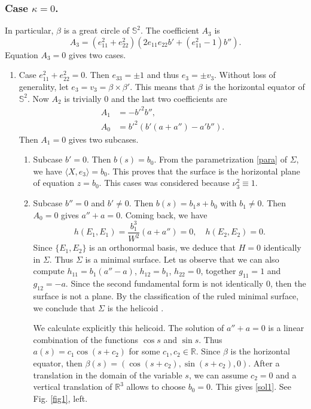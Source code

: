 \documentclass[12pt,a4paper,reqno]{amsart}
\def\r{\mathbb R}
\def\s{\mathbb S}
\begin{document}
\subsubsection{Case $\kappa=0$. } In particular, $\beta$ is a great circle of $\s^2$. The coefficient $A_3$ is 
$$A_3=(e_{11}^2+e_{22}^2)\left(2e_{11}e_{22}b'+(e_{11}^2-1)b''\right).$$
Equation $A_3=0$ gives two cases.
\begin{enumerate}
\item Case $e_{11}^2+e_{22}^2=0$. Then $e_{33}=\pm 1$ and thus $e_3=\pm v_3$. Without loss of generality, let $e_3=v_3=\beta\times\beta'$. This means that $\beta$ is the horizontal equator of $\s^2$.   Now $A_2$ is trivially $0$ and the last two coefficients are
\begin{equation*}
\begin{split}
A_1&=-b'^2b'',\\
A_0&=b'^2(b'(a+a'')-a'b'').
\end{split}
\end{equation*}
Then $A_1=0$ gives two subcases.
\begin{enumerate}
\item Subcase $b'=0$. Then $b(s)=b_0$. From the parametrization \eqref{para}  of $\Sigma$, we have $\langle X,e_3\rangle=b_0$. This proves that the surface is the horizontal plane of equation $z=b_0$.  This cases was considered because $\nu_3^2\equiv 1$. 
\item Subcase $b''=0$ and $b'\not=0$. Then $b(s)=b_1s+b_0$ with $b_1\not=0$. Then $A_0=0$ gives $a''+a=0$. Coming back, we have $$h(E_1,E_1)=\frac{b_1^3}{W^2}(a+a'')=0,\quad h(E_2,E_2)=0.$$
Since $\{E_1,E_2\}$ is an orthonormal basis, we deduce  that $H=0$ identically in $\Sigma$. Thus $\Sigma$ is a minimal surface. Let us observe that we can also compute 
$h_{11}=b_1(a''-a)$, $h_{12}=b_1$, $h_{22}=0$, together $g_{11}=1$ and $g_{12}=-a$. Since the second fundamental form is not identically $0$,  then the surface is not a plane. By the classification of the ruled minimal surface, we conclude that  $\Sigma$ is the helicoid \cite{ca}. 

We calculate explicitly this helicoid. The solution of $a''+a=0$ is a linear combination of the functions $\cos s$ and $\sin s$. Thus $a(s)=c_1\cos(s+c_2)$ for some $c_1,c_2\in\r$. Since $\beta$ is the horizontal equator, then $\beta(s)=(\cos (s+c_2),\sin (s+c_2),0)$. After a translation in the domain of the variable $s$, we can assume $c_2=0$ and a vertical translation of $\r^3$ allows to choose  $b_0=0$.   This gives \eqref{sol1}. See Fig. \ref{fig1}, left. 




\end{enumerate}
\end{enumerate}
\end{document}
